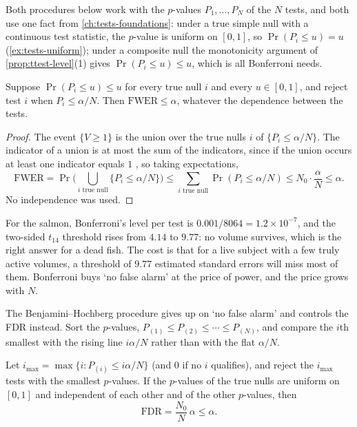 Both procedures below work with the $p$-values $P_1, \ldots, P_N$ of the $N$ tests, and both use one fact from \cref{ch:tests-foundations}: under a true simple null with a continuous test statistic, the $p$-value is uniform on $[0, 1]$, so $\Pr(P_i \leq u) = u$ (\cref{ex:tests-uniform}); under a composite null the monotonicity argument of \cref{prop:ttest-level}(1) gives $\Pr(P_i \leq u) \leq u$, which is all Bonferroni needs.

\begin{proposition}
\label{prop:bonferroni}
Suppose $\Pr(P_i \leq u) \leq u$ for every true null $i$ and every $u \in [0,1]$, and reject test $i$ when $P_i \leq \alpha/N$.
Then $\mathrm{FWER} \leq \alpha$, whatever the dependence between the tests.
\end{proposition}

\begin{proof}
The event $\{V \geq 1\}$ is the union over the true nulls $i$ of $\{P_i \leq \alpha/N\}$.
The indicator of a union is at most the sum of the indicators, since if the union occurs at least one indicator equals $1$ , so taking expectations,
\[
\mathrm{FWER} = \Pr\Big(\bigcup_{i \text{ true null}}\{P_i \leq \alpha/N\}\Big) \leq \sum_{i \text{ true null}} \Pr(P_i \leq \alpha/N) \leq N_0 \cdot \frac{\alpha}{N} \leq \alpha.
\]
No independence was used.
\end{proof}

For the salmon, Bonferroni's level per test is $0.001/8064 = 1.2 \times 10^{-7}$, and the two-sided $t_{14}$ threshold rises from $4.14$ to $9.77$: no volume survives, which is the right answer for a dead fish.
The cost is that for a live subject with a few truly active volumes, a threshold of $9.77$ estimated standard errors will miss most of them.
Bonferroni buys `no false alarm' at the price of power, and the price grows with $N$.

The Benjamini--Hochberg procedure gives up on `no false alarm' and controls the FDR instead.
Sort the $p$-values, $P_{(1)} \leq P_{(2)} \leq \cdots \leq P_{(N)}$, and compare the $i$th smallest with the rising line $i\alpha/N$ rather than with the flat $\alpha/N$.

\begin{theorem}
\label{thm:bh}
Let $i_{\max} = \max\{i : P_{(i)} \leq i\alpha/N\}$ (and $0$ if no $i$ qualifies), and reject the $i_{\max}$ tests with the smallest $p$-values.
If the $p$-values of the true nulls are uniform on $[0,1]$ and independent of each other and of the other $p$-values, then
\[
\mathrm{FDR} = \frac{N_0}{N}\,\alpha \leq \alpha.
\]
\end{theorem}

